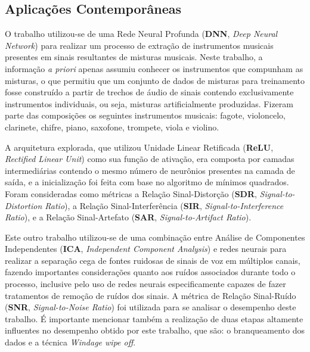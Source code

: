 







\subsection{Aplicações Contemporâneas}
\label{subsec:contemp_app}

O trabalho \citep{7178348} utilizou-se de uma Rede Neural Profunda (\textbf{DNN}, \textit{Deep Neural Network}) para realizar um processo de extração de instrumentos musicais presentes em sinais resultantes de misturas musicais. Neste trabalho, a informação \textit{a priori} apenas assumiu conhecer os instrumentos que compunham as misturas, o que permitiu que um conjunto de dados de misturas para treinamento fosse construído a partir de trechos de áudio de sinais contendo exclusivamente instrumentos individuais, ou seja, misturas artificialmente produzidas. Fizeram parte das composições os seguintes instrumentos musicais: fagote, violoncelo, clarinete, chifre, piano, saxofone, trompete, viola e violino.



A arquitetura explorada, que utilizou Unidade Linear Retificada (\textbf{ReLU}, \textit{Rectified Linear Unit}) \citep{nair2010rectified} como sua função de ativação, era composta por camadas intermediárias contendo o mesmo número de neurônios presentes na camada de saída, e a inicialização foi feita com base no algoritmo de mínimos quadrados. Foram consideradas como métricas a Relação Sinal-Distorção (\textbf{SDR}, \textit{Signal-to-Distortion Ratio}), a Relação Sinal-Interferência (\textbf{SIR}, \textit{Signal-to-Interference Ratio}), e a Relação Sinal-Artefato (\textbf{SAR}, \textit{Signal-to-Artifact Ratio}).


Este outro trabalho \citep{6245800} utilizou-se de uma combinação entre Análise de Componentes Independentes (\textbf{ICA}, \textit{Independent Component Analysis}) e redes neurais para realizar a separação cega de fontes ruidosas de sinais de voz em múltiplos canais, fazendo importantes considerações quanto aos ruídos associados durante todo o processo, inclusive pelo uso de redes neurais especificamente capazes de fazer tratamentos de remoção de ruídos dos sinais. A métrica de Relação Sinal-Ruído (\textbf{SNR}, \textit{Signal-to-Noise Ratio}) foi utilizada para se analisar o desempenho deste trabalho. É importante mencionar também a realização de duas etapas altamente influentes no desempenho obtido por este trabalho, que são: o branqueamento dos dados e a técnica \textit{Windage wipe off}.

